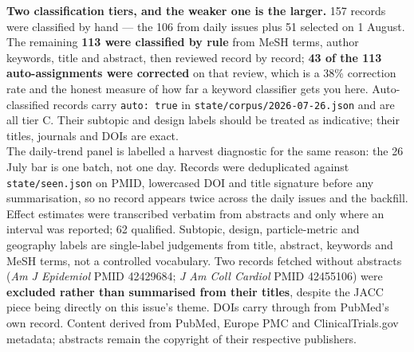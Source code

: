 \documentclass[10pt]{article}
\begin{document}
\begin{keybox}
{\textbf{Two classification tiers, and the weaker one is the larger.} 157 records were
classified by hand --- the 106 from daily issues plus 51 selected on 1 August. The
remaining \textbf{113 were classified by rule} from MeSH terms, author keywords, title and
abstract, then reviewed record by record; \textbf{43 of the 113 auto-assignments were
corrected} on that review, which is a 38\% correction rate and the honest measure of how
far a keyword classifier gets you here. Auto-classified records carry
\texttt{auto: true} in \texttt{state/corpus/2026-07-26.json} and are all tier C. Their
subtopic and design labels should be treated as indicative; their titles, journals and
DOIs are exact.
\\[1.0mm]
The daily-trend panel is labelled a harvest diagnostic for the same reason: the 26 July
bar is one batch, not one day. Records were deduplicated against
\texttt{state/seen.json} on PMID, lowercased DOI and title signature before any
summarisation, so no record appears twice across the daily issues and the backfill.
Effect estimates were transcribed verbatim from abstracts and only where an interval was
reported; 62 qualified. Subtopic, design, particle-metric and geography labels are
single-label judgements from title, abstract, keywords and MeSH terms, not a controlled
vocabulary. Two records fetched without abstracts (\textit{Am J Epidemiol} PMID 42429684;
\textit{J Am Coll Cardiol} PMID 42455106) were \textbf{excluded rather than summarised
from their titles}, despite the JACC piece being directly on this issue's theme. DOIs
carry through from PubMed's own record. Content derived from PubMed, Europe PMC and
ClinicalTrials.gov metadata; abstracts remain the copyright of their respective
publishers.\par}
\end{keybox}
\end{document}
